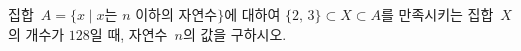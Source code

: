 집합~$A=\{x \mid x$는 $n$ 이하의 자연수$\}$에 대하여 $\{2,\,3\}\subset X\subset A$를 만족시키는 집합~$X$의 개수가 $128$일 때, 자연수~$n$의 값을 구하시오.
